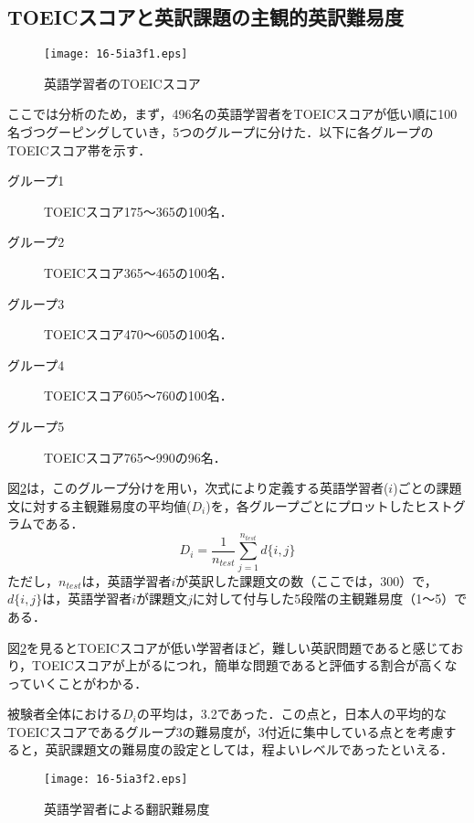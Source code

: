 \documentclass[japanese]{jnlp_1.4}
\begin{document}
\subsection{TOEICスコアと英訳課題の主観的英訳難易度}
\label{class}

\begin{figure}[t]
\begin{center}
\texttt{[image: 16-5ia3f1.eps]}
\end{center}
\caption{英語学習者のTOEICスコア}
\label{fig:histgram}
\end{figure}

ここでは分析のため，まず，496名の英語学習者をTOEICスコアが低い順に100名づつグーピングしていき，5つのグループに分けた．以下に各グループのTOEICスコア帯を示す．
\begin{description}
\item[グループ1 ]TOEICスコア175〜365の100名．
\item[グループ2 ]TOEICスコア365〜465の100名．
\item[グループ3 ]TOEICスコア470〜605の100名．
\item[グループ4 ]TOEICスコア605〜760の100名．
\item[グループ5 ]TOEICスコア765〜990の96名．
\end{description}
図\ref{fig:hist_dif}は，このグループ分けを用い，次式により定義する英語学習者($i$)ごとの課題文に対する主観難易度の平均値($D_{i}$)を，各グループごとにプロットしたヒストグラムである．
\begin{equation}
D_{i} = \frac{1}{n_{test}} \sum_{j=1}^{n_{test}}d\{i,j\}
\label{eq:dif}
\end{equation}
ただし，$n_{test}$は，英語学習者$i$が英訳した課題文の数（ここでは，300）で，$d\{i,j\}$は，英語学習者$i$が課題文$j$に対して付与した5段階の主観難易度（1〜5）である．

図\ref{fig:hist_dif}を見るとTOEICスコアが低い学習者ほど，難しい英訳問題であると感じており，TOEICスコアが上がるにつれ，簡単な問題であると評価する割合が高くなっていくことがわかる．

被験者全体における$D_{i}$の平均は，3.2であった．この点と，日本人の平均的なTOEICスコアであるグループ3の難易度が，3付近に集中している点とを考慮すると，英訳課題文の難易度の設定としては，程よいレベルであったといえる．


\begin{figure}[t]
\begin{center}
\texttt{[image: 16-5ia3f2.eps]}
\end{center}
\caption{英語学習者による翻訳難易度}
\label{fig:hist_dif}
\end{figure}
\end{document}
